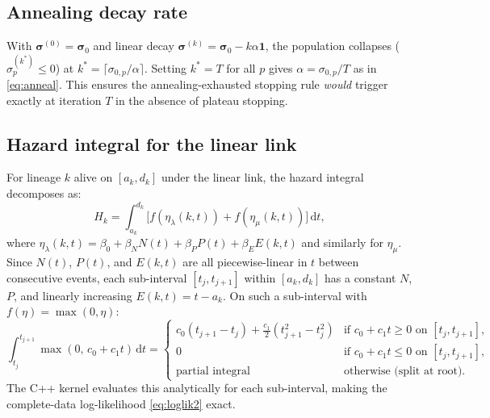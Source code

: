 \documentclass[12pt,a4paper]{article}
\newcommand{\dd}{\,\mathrm{d}}
\begin{document}
\subsection{Annealing decay rate}

With $\bm{\sigma}^{(0)} = \bm{\sigma}_0$ and linear decay
$\bm{\sigma}^{(k)} = \bm{\sigma}_0 - k\alpha\mathbf{1}$, the population
collapses ($\sigma_p^{(k^*)} \leq 0$) at $k^* = \lceil\sigma_{0,p}/\alpha\rceil$.
Setting $k^* = T$ for all $p$ gives $\alpha = \sigma_{0,p}/T$ as in
\eqref{eq:anneal}. This ensures the annealing-exhausted stopping rule
\emph{would} trigger exactly at iteration $T$ in the absence of plateau
stopping.

\subsection{Hazard integral for the linear link}\label{sec:hazard}

For lineage $k$ alive on $[a_k, d_k]$ under the linear link, the hazard
integral decomposes as:
\begin{equation}
  H_k = \int_{a_k}^{d_k}
    \bigl[f(\eta_\lambda(k,t)) + f(\eta_\mu(k,t))\bigr]\dd t,
\end{equation}
where $\eta_\lambda(k,t) = \beta_0 + \beta_N N(t) + \beta_P P(t)
+ \beta_E E(k,t)$ and similarly for $\eta_\mu$. Since $N(t)$, $P(t)$,
and $E(k,t)$ are all piecewise-linear in $t$ between consecutive events,
each sub-interval $[t_j, t_{j+1}]$ within $[a_k, d_k]$ has a constant
$N$, $P$, and linearly increasing $E(k,t) = t - a_k$. On such a
sub-interval with $f(\eta) = \max(0,\eta)$:
\begin{equation}
  \int_{t_j}^{t_{j+1}} \max(0,\, c_0 + c_1 t)\dd t
  = \begin{cases}
      c_0(t_{j+1}-t_j) + \tfrac{c_1}{2}(t_{j+1}^2 - t_j^2)
        & \text{if } c_0 + c_1 t \geq 0 \text{ on } [t_j,t_{j+1}], \\
      0 & \text{if } c_0 + c_1 t \leq 0 \text{ on } [t_j,t_{j+1}], \\
      \text{partial integral} & \text{otherwise (split at root).}
    \end{cases}
\end{equation}
The C++ kernel evaluates this analytically for each sub-interval, making
the complete-data log-likelihood \eqref{eq:loglik2} exact.
\end{document}
